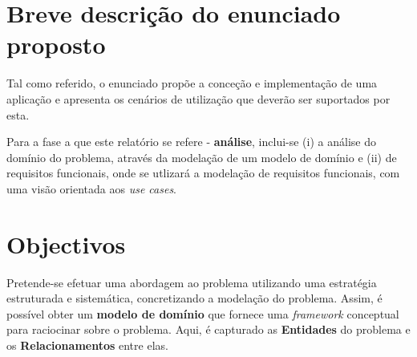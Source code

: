 \documentclass[a4paper,12pt]{scrreprt}
\begin{document}
\section{Breve descrição do enunciado proposto}

Tal como referido, o enunciado propõe a conceção e implementação de uma aplicação e apresenta os cenários de utilização que deverão ser
suportados por esta.

Para a fase a que este relatório se refere - \textbf{análise}, inclui-se 
(i) a análise do domínio do problema, através da modelação de um modelo de domínio e 
(ii) de requisitos funcionais, onde se utlizará a modelação de requisitos funcionais, com uma visão orientada aos \textit{use cases}.






\section{Objectivos}
Pretende-se efetuar uma abordagem ao problema utilizando uma estratégia estruturada e sistemática, concretizando a modelação do problema.
Assim, é possível obter um \textbf{modelo de domínio} que fornece uma \textit{framework} conceptual para raciocinar sobre o problema.
Aqui, é capturado as \textbf{Entidades} do problema e os \textbf{Relacionamentos} entre elas.
\end{document}
